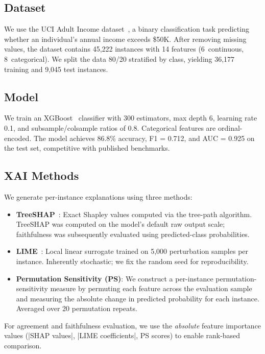 \documentclass[conference, 10pt]{IEEEtran}
\begin{document}
\subsection{Dataset}

We use the UCI Adult Income dataset~\cite{adult_dataset}, a binary classification task predicting whether an individual's annual income exceeds \$50K. After removing missing values, the dataset contains 45,222 instances with 14 features (6~continuous, 8~categorical). We split the data 80/20 stratified by class, yielding 36,177 training and 9,045 test instances.

\subsection{Model}

We train an XGBoost~\cite{chen2016xgboost} classifier with 300 estimators, max depth 6, learning rate 0.1, and subsample/colsample ratios of 0.8. Categorical features are ordinal-encoded. The model achieves 86.8\% accuracy, F1 = 0.712, and AUC = 0.925 on the test set, competitive with published benchmarks.

\subsection{XAI Methods}

We generate per-instance explanations using three methods:

\begin{itemize}[leftmargin=*]
    \item \textbf{TreeSHAP}~\cite{lundberg2020treeshap}: Exact Shapley values computed via the tree-path algorithm. TreeSHAP was computed on the model's default raw output scale; faithfulness was subsequently evaluated using predicted-class probabilities.
    \item \textbf{LIME}~\cite{ribeiro2016lime}: Local linear surrogate trained on 5,000 perturbation samples per instance. Inherently stochastic; we fix the random seed for reproducibility.
    \item \textbf{Permutation Sensitivity (PS)}: We construct a per-instance permutation-sensitivity measure by permuting each feature across the evaluation sample and measuring the absolute change in predicted probability for each instance. Averaged over 20 permutation repeats.
\end{itemize}

For agreement and faithfulness evaluation, we use the \emph{absolute} feature importance values (|SHAP values|, |LIME coefficients|, PS scores) to enable rank-based comparison.
\end{document}
